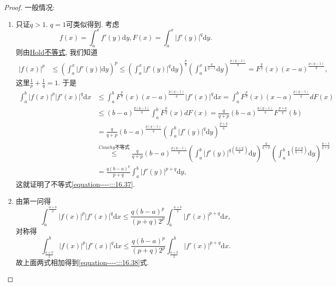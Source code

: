 \documentclass[../../main.tex]{subfiles}
\begin{document}
\begin{proof}
{\heiti 一般情况:}
\begin{enumerate}
\item 只证\(q>1\). \(q = 1\)可类似得到. 考虑
\[f(x)=\int_{a}^{x}f'(y)\mathrm{d}y, F(x)=\int_{a}^{x}|f'(y)|^{q}\mathrm{d}y.\]
则由\hyperref[theorem:Hold(赫尔德)不等式(积分形式)]{Hold不等式}, 我们知道
\begin{align*}
|f(x)|^{p}&\leqslant \left(\int_{a}^{x}|f'(y)|\mathrm{d}y\right)^{p} \leqslant \left(\int_{a}^{x}|f'(y)|^{q}\mathrm{d}y\right)^{\frac{p}{q}}\left(\int_{a}^{x}1^{\frac{q}{q - 1}}\mathrm{d}y\right)^{\frac{p(q - 1)}{q}} = F^{\frac{p}{q}}(x)(x - a)^{\frac{p(q - 1)}{q}},
\end{align*}
这里\(\frac{1}{p}+\frac{1}{q}=1\).
于是
\begin{align*}
\int_{a}^{b}|f(x)|^{p}|f'(x)|^{q}\mathrm{d}x &\leqslant \int_{a}^{b}F^{\frac{p}{q}}(x)(x - a)^{\frac{p(q - 1)}{q}}|f'(x)|^{q}\mathrm{d}x = \int_{a}^{b}F^{\frac{p}{q}}(x)(x - a)^{\frac{p(q - 1)}{q}}dF(x)\\
&\leqslant (b - a)^{\frac{p(q - 1)}{q}}\int_{a}^{b}F^{\frac{p}{q}}(x)dF(x) = \frac{q}{q + p}(b - a)^{\frac{p(q - 1)}{q}}F^{\frac{p + q}{q}}(b)\\
&=\frac{q}{q + p}(b - a)^{\frac{p(q - 1)}{q}}\left(\int_{a}^{b}|f'(y)|^{q}\mathrm{d}y\right)^{\frac{p + q}{q}}\\
&\stackrel{Cauchy\text{不等式}}{\leqslant} \frac{q}{q + p}(b - a)^{\frac{p(q - 1)}{q}}\left(\int_{a}^{b}|f'(y)|^{q(\frac{p + q}{q})}\mathrm{d}y\right)^{\frac{q}{q + p}}\left(\int_{a}^{b}1^{(\frac{p + q}{q - 1})}\mathrm{d}y\right)^{\frac{q - 1}{q + p}}\\
&=\frac{q(b - a)^{p}}{p + q}\int_{a}^{b}|f'(y)|^{p + q}\mathrm{d}y,
\end{align*}
这就证明了不等式\eqref{equation----:::16.37}.

\item 由第一问得
\[\int_{a}^{\frac{a + b}{2}}|f(x)|^{p}|f'(x)|^{q}\mathrm{d}x \leqslant \frac{q(b - a)^{p}}{(p + q)2^{p}}\int_{a}^{\frac{a + b}{2}}|f'(x)|^{p + q}\mathrm{d}x,\]
对称得
\[\int_{\frac{a + b}{2}}^{b}|f(x)|^{p}|f'(x)|^{q}\mathrm{d}x \leqslant \frac{q(b - a)^{p}}{(p + q)2^{p}}\int_{\frac{a + b}{2}}^{b}|f'(x)|^{p + q}\mathrm{d}x.\] 
故上面两式相加得到\eqref{equation----:::16.38}式.
\end{enumerate}
\end{proof}
\end{document}
